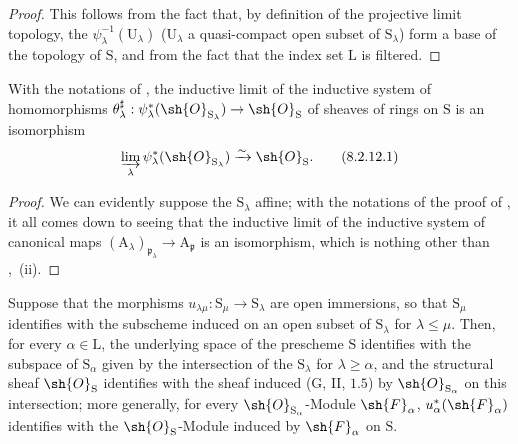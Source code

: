 \begin{proof}
This follows from the fact that, by definition of the projective limit topology, the $\psi_\lambda^{-1}(\mathrm{U}_\lambda)$ ($\mathrm{U}_\lambda$ a quasi-compact open subset of $\mathrm{S}_\lambda$) form a base of the topology of $\mathrm{S}$, and from the fact that the index set $\mathrm{L}$ is filtered.
\end{proof}

\begin{corollary}[8.2.12]
\label{IV.8.2.12}
With the notations of , the inductive limit of the inductive system of homomorphisms $\theta_\lambda^\sharp:\psi_\lambda^*(\sh{O}_{\mathrm{S}_\lambda})\to\sh{O}_\mathrm{S}$ of sheaves of rings on $\mathrm{S}$ is an isomorphism
\begin{equation}
  \varinjlim_\lambda\psi_\lambda^*(\sh{O}_{\mathrm{S}_\lambda})\xrightarrow{\sim}\sh{O}_\mathrm{S}.
  \label{IV.8.2.12.1}
\tag{8.2.12.1}
\end{equation}
\end{corollary}

\begin{proof}
We can evidently suppose the $\mathrm{S}_\lambda$ affine; with the notations of the proof of , it all comes down to seeing that the inductive limit of the inductive system of canonical maps $(\mathrm{A}_\lambda)_{\mathfrak{p}_\lambda}\to\mathrm{A}_\mathfrak{p}$ is an isomorphism, which is nothing other than ,~(ii).
\end{proof}

\begin{proposition}[8.2.13]
\label{IV.8.2.13}
Suppose that the morphisms $u_{\lambda\mu}:\mathrm{S}_\mu\to\mathrm{S}_\lambda$ are open immersions, so that $\mathrm{S}_\mu$ identifies with the subscheme induced on an open subset of $\mathrm{S}_\lambda$ for $\lambda\leqslant\mu$.
Then, for every $\alpha\in\mathrm{L}$, the underlying space of the prescheme $\mathrm{S}$ identifies with the subspace of $\mathrm{S}_\alpha$ given by the intersection of the $\mathrm{S}_\lambda$ for $\lambda\geqslant\alpha$, and the structural sheaf $\sh{O}_\mathrm{S}$ identifies with the sheaf induced \textnormal{(}$\mathrm{G}$, II, $1.5$\textnormal{)} by $\sh{O}_{\mathrm{S}_\alpha}$ on this intersection; more generally, for every $\sh{O}_{\mathrm{S}_\alpha}$-Module $\sh{F}_\alpha$, $u_\alpha^*(\sh{F}_\alpha)$ identifies with the $\sh{O}_\mathrm{S}$-Module induced by $\sh{F}_\alpha$ on $\mathrm{S}$.
\end{proposition}

